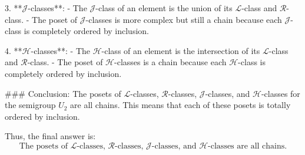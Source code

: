 3. **\(\mathcal{J}\)-classes**:
   - The \(\mathcal{J}\)-class of an element is the union of its \(\mathcal{L}\)-class and \(\mathcal{R}\)-class.
   - The poset of \(\mathcal{J}\)-classes is more complex but still a chain because each \(\mathcal{J}\)-class is completely ordered by inclusion.

4. **\(\mathcal{H}\)-classes**:
   - The \(\mathcal{H}\)-class of an element is the intersection of its \(\mathcal{L}\)-class and \(\mathcal{R}\)-class.
   - The poset of \(\mathcal{H}\)-classes is a chain because each \(\mathcal{H}\)-class is completely ordered by inclusion.

### Conclusion:
The posets of \(\mathcal{L}\)-classes, \(\mathcal{R}\)-classes, \(\mathcal{J}\)-classes, and \(\mathcal{H}\)-classes for the semigroup \(U_2\) are all chains. This means that each of these posets is totally ordered by inclusion.

Thus, the final answer is:
\[
\boxed{\text{The posets of } \mathcal{L}\text{-classes, } \mathcal{R}\text{-classes, } \mathcal{J}\text{-classes, and } \mathcal{H}\text{-classes are all chains.}}
\]